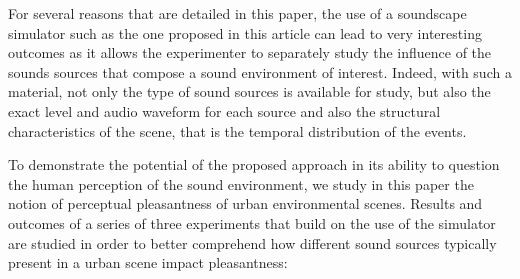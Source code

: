 \documentclass[twoside,twocolumn]{article}
\begin{document}
For several reasons that are detailed in this paper, the use of a soundscape simulator such as the one proposed in this article can lead to very interesting outcomes as it allows the experimenter to separately study  the influence of the sounds sources that compose a sound environment of interest. Indeed, with such a material, not only the type of sound sources is available for study, but also the exact level and audio waveform for each source and also the structural characteristics of the scene, that is the temporal distribution of the events.



To demonstrate the potential of the proposed approach in its ability to question the human perception of the sound environment, we study in this paper the notion of perceptual pleasantness of urban environmental scenes. Results and outcomes of a series of three experiments that build on the use of the simulator are studied in order to better comprehend how different sound sources typically present in a urban scene impact pleasantness:

\end{document}
